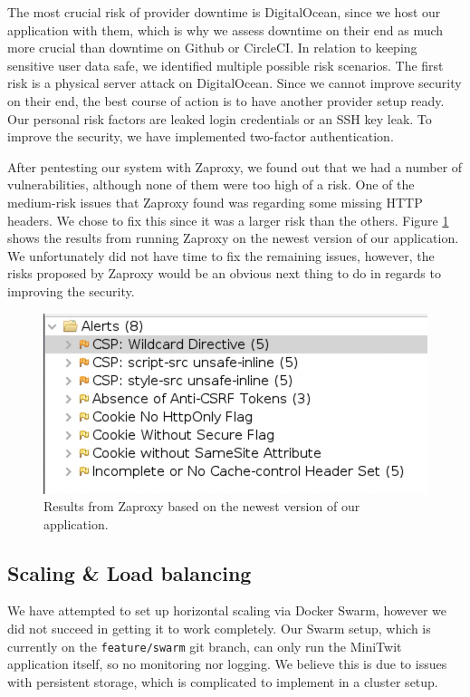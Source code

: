 The most crucial risk of provider downtime is DigitalOcean, since we host our application with them, which is why we assess downtime on their end as much more crucial than downtime on Github or CircleCI.
\newline
In relation to keeping sensitive user data safe, we identified multiple possible risk scenarios.
The first risk is a physical server attack on DigitalOcean. Since we cannot improve security on their end, the best course of action is to have another provider setup ready. Our personal risk factors are leaked login credentials or an SSH key leak. To improve the security, we have implemented two-factor authentication.



After pentesting our system with Zaproxy, we found out that we had a number of vulnerabilities, although none of them were too high of a risk. 
One of the medium-risk issues that Zaproxy found was regarding some missing HTTP headers. We chose to fix this since it was a larger risk than the others. Figure \ref{fig:Zaproxy_Updated} shows the results from running Zaproxy on the newest version of our application. We unfortunately did not have time to fix the remaining issues, however, the risks proposed by Zaproxy would be an obvious next thing to do in regards to improving the security.

\begin{figure}[H]
    \centering
    \includegraphics[scale=0.50]{images/security_risks_updated.png}
    \caption{Results from Zaproxy based on the newest version of our application.}
    \label{fig:Zaproxy_Updated}
\end{figure}


\subsection{Scaling \& Load balancing}

We have attempted to set up horizontal scaling via Docker Swarm, however we did not succeed in getting it to work completely. Our Swarm setup, which is currently on the \texttt{feature/swarm} git branch, can only run the MiniTwit application itself, so no monitoring nor logging. We believe this is due to issues with persistent storage, which is complicated to implement in a cluster setup.